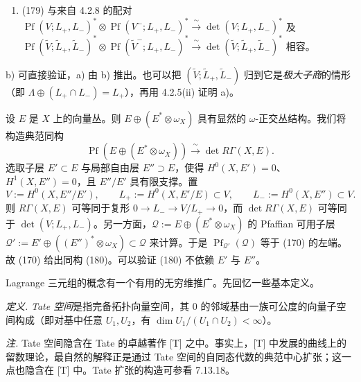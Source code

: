 \begin{enumerate}[label=\alph*),leftmargin=2.2em,start=2]
\item (179) 与来自 4.2.8 的配对
$\operatorname{Pf}(V;L_{+},L_{-})^{*}\otimes\operatorname{Pf}(V^{-};L_{+},L_{-})^{*}\xrightarrow{\ \sim\ }\det(V;L_{+},L_{-})^{*}$
及
$\operatorname{Pf}(\tilde{V};\tilde{L}_{+},\tilde{L}_{-})^{*}\otimes\operatorname{Pf}(\tilde{V}^{-};L_{+},L_{-})^{*}\xrightarrow{\ \sim\ }\det(\tilde{V};\tilde{L}_{+},\tilde{L}_{-})^{*}$
相容。
\end{enumerate}

b) 可直接验证，a) 由 b) 推出。也可以把 $(\tilde{V};\tilde{L}_{+},\tilde{L}_{-})$ 归到它是\emph{极大子商}的情形（即 $\Lambda\oplus(L_{+}\cap L_{-})=L_{+}$），再用 4.2.5(ii) 证明 a)。

 设 $E$ 是 $X$ 上的向量丛。则 $E\oplus(E^{*}\otimes\omega_{X})$ 具有显然的 $\omega$-正交丛结构。我们将构造典范同构
\begin{equation}\tag{180}
\operatorname{Pf}(E\oplus(E^{*}\otimes\omega_{X}))\xrightarrow{\ \sim\ }\det R\Gamma(X,E).
\end{equation}
选取子层 $E'\subset E$ 与局部自由层 $E''\supset E$，使得 $H^{0}(X,E')=0$、$H^{1}(X,E'')=0$，且 $E''/E'$ 具有限支撑。置
\[
V:=H^{0}(X,E''/E'),\qquad L_{+}:=H^{0}(X,E'/E)\subset V,\qquad L_{-}:=H^{0}(X,E'')\subset V.
\]
则 $R\Gamma(X,E)$ 可等同于复形 $0\to L_{-}\to V/L_{+}\to 0$，而 $\det R\Gamma(X,E)$ 可等同于 $\det(V;L_{+},L_{-})$。另一方面，$\mathcal{Q}:=E\oplus(E^{*}\otimes\omega_{X})$ 的 Pfaffian 可用子层 $\mathcal{Q}':=E'\oplus((E'')^{*}\otimes\omega_{X})\subset\mathcal{Q}$ 来计算。于是 $\operatorname{Pf}_{\mathcal{Q}'}(\mathcal{Q})$ 等于 (170) 的左端。故 (170) 给出同构 (180)。可以验证 (180) 不依赖 $E'$ 与 $E''$。

 Lagrange 三元组的概念有一个有用的无穷维推广。先回忆一些基本定义。

\emph{定义.} \emph{Tate 空间}是指完备拓扑向量空间，其 $0$ 的邻域基由一族可公度的向量子空间构成（即对基中任意 $U_{1},U_{2}$，有 $\dim U_{1}/(U_{1}\cap U_{2})<\infty$）。

\emph{注.} Tate 空间隐含在 Tate 的卓越著作 [T] 之中。事实上，[T] 中发展的曲线上的留数理论，最自然的解释正是通过 Tate 空间的自同态代数的典范中心扩张；这一点也隐含在 [T] 中。Tate 扩张的构造可参看 7.13.18。

